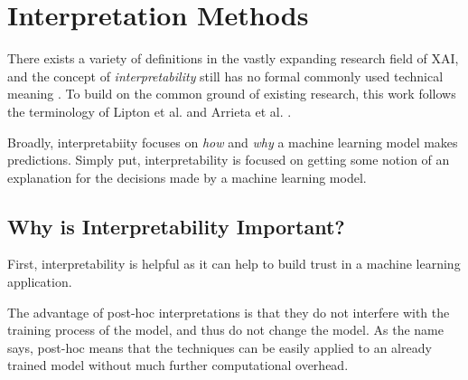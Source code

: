 \section{Interpretation Methods}
\label{sec:interpretation_methods}

There exists a variety of definitions in the vastly expanding research field of XAI, and the concept of \textit{interpretability} still has no formal commonly used technical meaning \cite{lipton2018mythos}. To build on the common ground of existing research, this work follows the terminology of Lipton et al. \cite{lipton2018mythos} and Arrieta et al. \cite{arrieta2020explainable}.

Broadly, interpretabiity focuses on \textit{how} and \textit{why} a machine learning model makes predictions.
Simply put, interpretability is focused on getting some notion of an explanation for the decisions made by a machine learning model.

\subsection{Why is Interpretability Important?}
\label{subsec:importance_of_interpretability}

First, interpretability is helpful as it can help to build trust in a machine learning application. 

The advantage of post-hoc interpretations is that they do not interfere with the training process of the model, and thus do not change the model. As the name says, post-hoc means that the techniques can be easily applied to an already trained model without much further computational overhead. 

